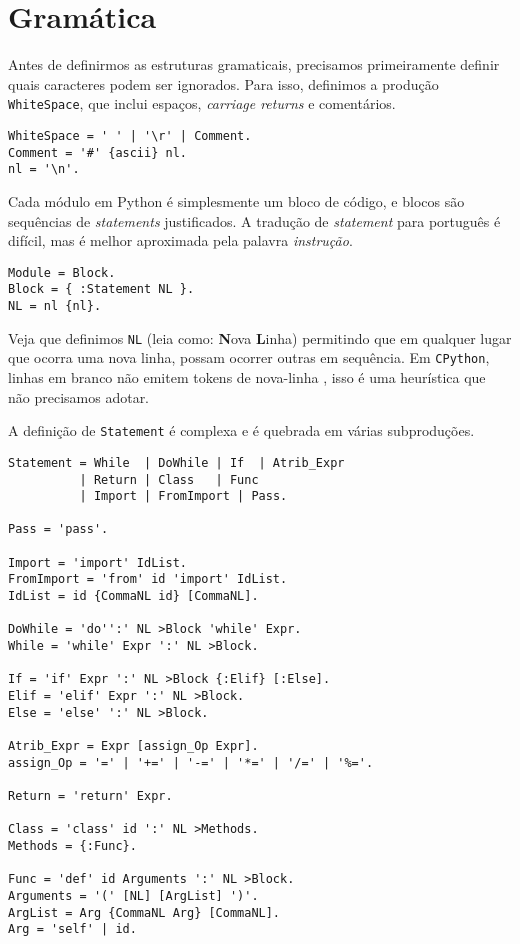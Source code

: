 \section{Gramática}

Antes de definirmos as estruturas gramaticais,
precisamos primeiramente definir quais caracteres
podem ser ignorados. Para isso, definimos a produção
\verb|WhiteSpace|, que inclui espaços, \textit{carriage returns}
e comentários.

\begin{lstlisting}
WhiteSpace = ' ' | '\r' | Comment.
Comment = '#' {ascii} nl.
nl = '\n'.
\end{lstlisting}

Cada módulo em Python é simplesmente um bloco de código,
e blocos são sequências de \textit{statements} justificados.
A tradução de \textit{statement} para português é difícil,
mas é melhor aproximada pela palavra \textit{instrução}.

\begin{lstlisting}
Module = Block.
Block = { :Statement NL }.
NL = nl {nl}.
\end{lstlisting}

 
\noindent Veja que definimos \verb|NL|
(leia como: \textbf{N}ova \textbf{L}inha)
permitindo que em qualquer lugar que ocorra uma nova linha,
possam ocorrer outras em sequência. Em \texttt{CPython},
linhas em branco não emitem tokens de nova-linha
\cite{blank_lines}, isso é uma heurística que não precisamos
adotar.

A definição de \verb|Statement| é complexa e é
quebrada em várias subproduções.

\begin{lstlisting}
Statement = While  | DoWhile | If  | Atrib_Expr
          | Return | Class   | Func
          | Import | FromImport | Pass.

Pass = 'pass'.

Import = 'import' IdList.
FromImport = 'from' id 'import' IdList.
IdList = id {CommaNL id} [CommaNL].

DoWhile = 'do'':' NL >Block 'while' Expr.
While = 'while' Expr ':' NL >Block.

If = 'if' Expr ':' NL >Block {:Elif} [:Else].
Elif = 'elif' Expr ':' NL >Block.
Else = 'else' ':' NL >Block.

Atrib_Expr = Expr [assign_Op Expr].
assign_Op = '=' | '+=' | '-=' | '*=' | '/=' | '%='.

Return = 'return' Expr.

Class = 'class' id ':' NL >Methods.
Methods = {:Func}.

Func = 'def' id Arguments ':' NL >Block.
Arguments = '(' [NL] [ArgList] ')'.
ArgList = Arg {CommaNL Arg} [CommaNL].
Arg = 'self' | id.
\end{lstlisting}

